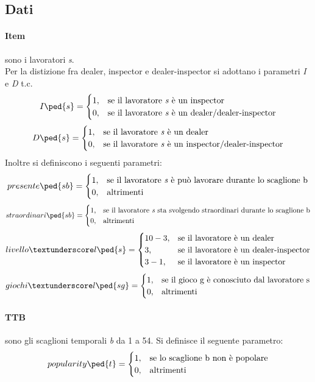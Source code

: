 \subsection{Dati}
\paragraph{Item} sono i lavoratori \textit{s}. \\Per la distizione fra dealer, inspector e dealer-inspector si adottano i parametri \textit{I} e \textit{D} t.c.
\[
I\ped{s} = \begin{cases}
1,& \text{se il lavoratore\ \textit{s} è un inspector}  \\
0,& \text{se il lavoratore\ \textit{s} è un dealer/dealer-inspector}
\end{cases}
\]
\[
D\ped{s} = \begin{cases}
1,& \text{se il lavoratore\ \textit{s} è un dealer}  \\
0,& \text{se il lavoratore\ \textit{s} è un inspector/dealer-inspector}
\end{cases}
\]
Inoltre si definiscono i seguenti parametri:
\[
presente\ped{sb} = \begin{cases}
1,& \text{se il lavoratore\ \textit{s} è può lavorare durante lo scaglione b}  \\
0,& \text{altrimenti}
\end{cases}
\]
\[
straordinari\ped{sb} = \begin{cases}
1,& \text{se il lavoratore\ \textit{s} sta svolgendo straordinari durante lo scaglione b}  \\
0,& \text{altrimenti}
\end{cases}
\]
\[
livello\textunderscore l\ped{s} = \begin{cases}
10-3,& \text{se il lavoratore è un dealer}  \\
3,& \text{se il lavoratore è un dealer-inspector} \\
3-1,& \text{se il lavoratore è un inspector} 
\end{cases}
\]
\[
giochi\textunderscore l\ped{sg} = \begin{cases}
1,& \text{se il gioco g è conosciuto dal lavoratore s}  \\
0,& \text{altrimenti}
\end{cases}
\]
\paragraph{TTB} sono gli scaglioni temporali \textit{b} da 1 a 54. Si definisce il seguente parametro:
\[
popularity\ped{t} = \begin{cases}
1,& \text{se lo scaglione b non è popolare}  \\
0,& \text{altrimenti}
\end{cases}
\]
